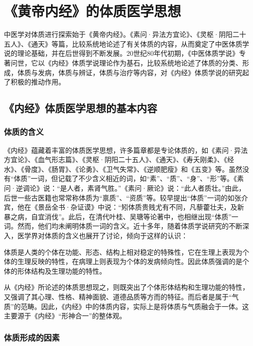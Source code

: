 \documentclass[draft,12pt]{ctexbook}
\begin{document}
\pagestyle{main}
\fi
\chapter{《黄帝内经》的体质医学思想}%

中医学对体质进行探索始于《黄帝内经》。《素问·异法方宜论》、《灵枢·阴阳二十五人》、《通天》等篇，比较系统地论述了有关体质的内容，从而奠定了中医体质学说的理论基础，并在后世得到不断发展。20世纪80年代初期，《中医体质学说》专著问世，它以《内经》体质学说理论作为基石，比较系统地论述了体质的分类、形成，体质与发病，体质与辨证，体质与治疗等内容，对《内经》体质学说的研究起了积极的推动作用。

\section{《内经》体质医学思想的基本内容}%

\subsection{体质的含义}%

《内经》蕴藏着丰富的体质医学思想，许多篇章都是专论体质的，如《素问·异法方宜论》、《血气形志篇》、《灵枢·阴阳二十五人》、《通天》、《寿夭刚柔》、《经水》、《骨度》、《肠胃》、《论勇》、《卫气失常》、《逆顺肥瘦》和《五变》等。虽然没有“体质”一词，但记载了不少含义相近的词，如“素”、“质”、“身”、“形”等。《素问·逆调论》说：“是人者，素肾气胜。”《素问·厥论》说：“此人者质壮。”由此，后世一些古医籍也常常称体质为“禀质”、“资质”等。较早提出“体质”一词的如张介宾，他在《景岳全书·杂证谟》中说：“矧体质贵贱尤有不同，凡藜藿壮夫，及新暴之病，自宜消伐”。此后，在清代叶桂、吴瑭等论著中，也相继出现“体质”一词。然而，他们均未阐明体质一词的含义。近十多年，随着体质学说研究的不断深入，医学界对体质的含义也展开了讨论，倾向于这样的认识：

体质是人类的个体在功能、形态、结构上相对稳定的特殊性，它在生理上表现为个体的生理反映的特性，在病理上则表现为个体的发病倾向性。因此体质强调的是个体的形体结构及生理功能的特性。

从《内经》所论述的体质思想现之，则既突出了个体形体结构和生理功能的特性，又强调了其心理、性格、精神面貌、道德品质等方而的特征。而后者是属于“气质”的范畴。因此，《内经》中的体质内容，实际上是将体质与气质融会于一体。这主要源于《内经》“形神合一”的整体观。

\subsection{体质形成的因素}%
\end{document}

